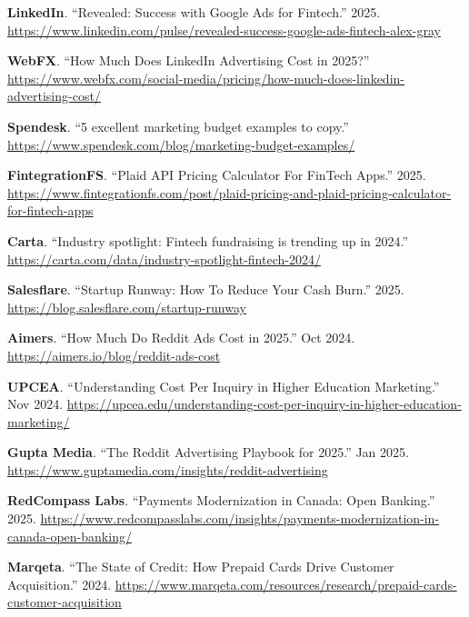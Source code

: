 \documentclass[11pt,letterpaper]{article}
\begin{document}
\begin{enumerate}[label={[{\arabic*}]}]
\item \textbf{LinkedIn}. ``Revealed: Success with Google Ads for Fintech.'' 2025.  
      \url{https://www.linkedin.com/pulse/revealed-success-google-ads-fintech-alex-gray}

\item \textbf{WebFX}. ``How Much Does LinkedIn Advertising Cost in 2025?''  
      \url{https://www.webfx.com/social-media/pricing/how-much-does-linkedin-advertising-cost/}

\item \textbf{Spendesk}. ``5 excellent marketing budget examples to copy.''  
      \url{https://www.spendesk.com/blog/marketing-budget-examples/}

\item \textbf{FintegrationFS}. ``Plaid API Pricing Calculator For FinTech Apps.'' 2025.  
      \url{https://www.fintegrationfs.com/post/plaid-pricing-and-plaid-pricing-calculator-for-fintech-apps}

\item \textbf{Carta}. ``Industry spotlight: Fintech fundraising is trending up in 2024.''  
      \url{https://carta.com/data/industry-spotlight-fintech-2024/}

\item \textbf{Salesflare}. ``Startup Runway: How To Reduce Your Cash Burn.'' 2025.  
      \url{https://blog.salesflare.com/startup-runway}

\item \textbf{Aimers}. ``How Much Do Reddit Ads Cost in 2025.'' Oct 2024.  
      \url{https://aimers.io/blog/reddit-ads-cost}

\item \textbf{UPCEA}. ``Understanding Cost Per Inquiry in Higher Education Marketing.'' Nov 2024.  
      \url{https://upcea.edu/understanding-cost-per-inquiry-in-higher-education-marketing/}

\item \textbf{Gupta Media}. ``The Reddit Advertising Playbook for 2025.'' Jan 2025.  
      \url{https://www.guptamedia.com/insights/reddit-advertising}

\item \textbf{RedCompass Labs}. ``Payments Modernization in Canada: Open Banking.'' 2025.  
      \url{https://www.redcompasslabs.com/insights/payments-modernization-in-canada-open-banking/}

\item \textbf{Marqeta}. ``The State of Credit: How Prepaid Cards Drive Customer Acquisition.'' 2024.  
      \url{https://www.marqeta.com/resources/research/prepaid-cards-customer-acquisition}


\end{enumerate}
\end{document}
